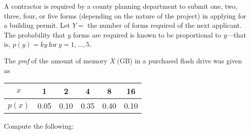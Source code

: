 \documentclass[letterpaper,12pt,addpoints]{exam}
\begin{document}
\clearpage
\begin{questions}
\question
A contractor is required by a county planning department to submit one, two, three, four, or five forms (depending on the nature of the project) in applying for a building permit. Let $Y=$ the number of forms required of the next applicant. The probability that $y$ forms are required is known to be proportional to $y$---that is, $p(y)=ky\ \text{for}\ y=1,\dots,5.$


\clearpage
\question
The \textit{pmf} of the amount of memory \textit{X} (GB) in a purchased flash drive was given as
\begin{center}
\begin{tabular}{c|c|c|c|c|c} 
 $x$ & 1 & 2 & 4 & 8 & 16 \\
 \hline
 $p(x)$ & 0.05 & 0.10 & 0.35 & 0.40 & 0.10\\  
\end{tabular}
\end{center}
Compute the following:
\end{questions}
\end{document}
